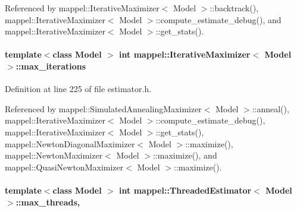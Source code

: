 Referenced by mappel\+::\+Iterative\+Maximizer$<$ Model $>$\+::backtrack(), mappel\+::\+Iterative\+Maximizer$<$ Model $>$\+::compute\+\_\+estimate\+\_\+debug(), and mappel\+::\+Iterative\+Maximizer$<$ Model $>$\+::get\+\_\+stats().

\paragraph[{\texorpdfstring{max\+\_\+iterations}{max_iterations}}]{\setlength{\rightskip}{0pt plus 5cm}template$<$class Model $>$ int {\bf mappel\+::\+Iterative\+Maximizer}$<$ Model $>$\+::max\+\_\+iterations\hspace{0.3cm}{\ttfamily [protected]}}\hypertarget{classmappel_1_1IterativeMaximizer_ac888935f332b069836a559f44cd267c7}{}\label{classmappel_1_1IterativeMaximizer_ac888935f332b069836a559f44cd267c7}


Definition at line 225 of file estimator.\+h.



Referenced by mappel\+::\+Simulated\+Annealing\+Maximizer$<$ Model $>$\+::anneal(), mappel\+::\+Iterative\+Maximizer$<$ Model $>$\+::compute\+\_\+estimate\+\_\+debug(), mappel\+::\+Iterative\+Maximizer$<$ Model $>$\+::get\+\_\+stats(), mappel\+::\+Newton\+Diagonal\+Maximizer$<$ Model $>$\+::maximize(), mappel\+::\+Newton\+Maximizer$<$ Model $>$\+::maximize(), and mappel\+::\+Quasi\+Newton\+Maximizer$<$ Model $>$\+::maximize().

\paragraph[{\texorpdfstring{max\+\_\+threads}{max_threads}}]{\setlength{\rightskip}{0pt plus 5cm}template$<$class Model $>$ int {\bf mappel\+::\+Threaded\+Estimator}$<$ Model $>$\+::max\+\_\+threads\hspace{0.3cm}{\ttfamily [protected]}, {\ttfamily [inherited]}}\hypertarget{classmappel_1_1ThreadedEstimator_a31391f8aaab3484f58bfdedbdb22be42}{}\label{classmappel_1_1ThreadedEstimator_a31391f8aaab3484f58bfdedbdb22be42}


